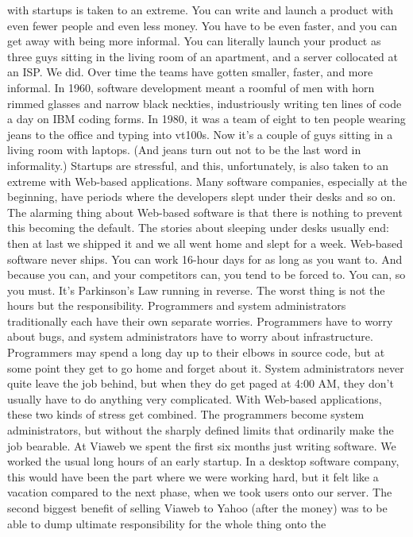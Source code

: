 with startups is taken to an extreme.  You can write and launch a
product with even fewer people and even less money.  You have to
be even faster, and you can get away with being more informal.
You can literally launch your product as three guys sitting in the
living room of an apartment, and a server collocated at an ISP.
We did.
Over time the teams have gotten smaller, faster, and more informal.
In 1960, software development meant a roomful of men with horn
rimmed glasses and narrow black neckties, industriously writing
ten lines of code a day on IBM coding forms.  In 1980, it was a
team of eight to ten people wearing jeans to the office and typing
into vt100s.  Now it's a couple of guys sitting in a living room
with laptops.  (And jeans turn out not to be the last word in
informality.)
Startups are stressful, and this, unfortunately, is also taken to
an extreme with Web-based applications.  
Many software companies, especially at the beginning, have periods
where the developers slept under their desks and so on.  The alarming
thing about Web-based software is that there is nothing to prevent
this becoming the default.  The stories about sleeping under desks
usually end:  then at last we shipped it and we all went home and
slept for a week.  Web-based software never ships.  You can work
16-hour days for as long as you want to.  And because you can, and
your competitors can, you tend to be forced to.  You can, so you
must.  It's Parkinson's Law running in reverse.
The worst thing is not the hours but the responsibility.  Programmers
and system administrators traditionally each have their own separate
worries.  Programmers have to worry about bugs, and system
administrators have to worry about infrastructure.  Programmers
may spend a long day up to their elbows in source code, but at some
point they get to go home and forget about it.  System administrators
never quite leave the job behind, but when they do get paged at
4:00 AM, they don't usually have to do anything very complicated.
With Web-based applications, these two kinds of stress get combined.
The programmers become system administrators, but without the
sharply defined limits that ordinarily make the job bearable.
At Viaweb we spent the first six months just writing software.  We
worked the usual long hours of an early startup.  In a desktop
software company, this would have been the part where we were
working hard, but it felt like a vacation compared to the next
phase, when we took users onto our server.  The second biggest
benefit of selling Viaweb to Yahoo (after the money) was to be able
to dump ultimate responsibility for the whole thing onto the
